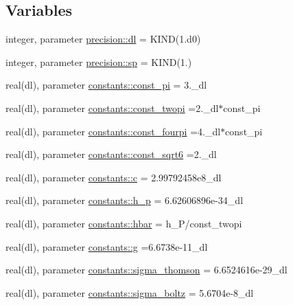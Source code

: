 \subsection*{Variables}
\begin{DoxyCompactItemize}
\item 
integer, parameter \mbox{\hyperlink{namespaceprecision_a34a15691a6734158d4c6252803a41375}{precision\+::dl}} = K\+I\+ND(1.d0)
\item 
integer, parameter \mbox{\hyperlink{namespaceprecision_a77972bedd8bb4ade1aeb2401fdfcda3f}{precision\+::sp}} = K\+I\+ND(1.)
\item 
real(dl), parameter \mbox{\hyperlink{namespaceconstants_ae6b5af15d3fb28a3dba468486c548447}{constants\+::const\+\_\+pi}} = 3.\+\_\+dl
\item 
real(dl), parameter \mbox{\hyperlink{namespaceconstants_ad32ef1a62efe7e7467e8533103380ce5}{constants\+::const\+\_\+twopi}} =2.\+\_\+dl$\ast$const\+\_\+pi
\item 
real(dl), parameter \mbox{\hyperlink{namespaceconstants_a4bd1ae51e175028d0c5bc4d28c2143e6}{constants\+::const\+\_\+fourpi}} =4.\+\_\+dl$\ast$const\+\_\+pi
\item 
real(dl), parameter \mbox{\hyperlink{namespaceconstants_af93a9bf45c9332880bda283f3b872ea3}{constants\+::const\+\_\+sqrt6}} =2.\+\_\+dl
\item 
real(dl), parameter \mbox{\hyperlink{namespaceconstants_acf9c352e48b37fa8a9aff3e5957246b8}{constants\+::c}} = 2.\+99792458e8\+\_\+dl
\item 
real(dl), parameter \mbox{\hyperlink{namespaceconstants_a3bfcfec5bb3ae395c9384035afa3ff0b}{constants\+::h\+\_\+p}} = 6.\+62606896e-\/34\+\_\+dl
\item 
real(dl), parameter \mbox{\hyperlink{namespaceconstants_abd8e8d59da6e319d106a046b7ffd1500}{constants\+::hbar}} = h\+\_\+P/const\+\_\+twopi
\item 
real(dl), parameter \mbox{\hyperlink{namespaceconstants_aa3593b18a3808f0dc490d4473e3f3108}{constants\+::g}} =6.\+6738e-\/11\+\_\+dl
\item 
real(dl), parameter \mbox{\hyperlink{namespaceconstants_aaf2f1c6fdfe22c4836ab4d2a47e53373}{constants\+::sigma\+\_\+thomson}} = 6.\+6524616e-\/29\+\_\+dl
\item 
real(dl), parameter \mbox{\hyperlink{namespaceconstants_a7c87c2c8bfe2b2f647e1ebaf8f66d6df}{constants\+::sigma\+\_\+boltz}} = 5.\+6704e-\/8\+\_\+dl
\item 

\end{DoxyCompactItemize}
